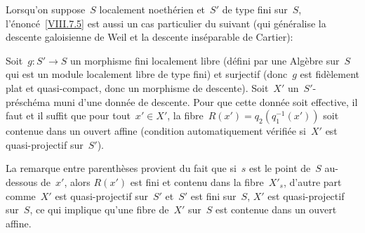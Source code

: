Lorsqu'on suppose~$S$ localement noeth\'erien et~$S'$ de type fini
sur~$S$, l'\'enonc\'e~\ref{VIII.7.5} est aussi un cas particulier
du suivant (qui g\'en\'eralise la descente galoisienne de Weil et
la descente ins\'eparable de Cartier):

\begin{corollaire}
\label{VIII.7.6}
Soit~$g\colon S'\to S$ un morphisme fini localement libre
(\ie d\'efini par une Alg\`ebre sur~$S$ qui est un module
localement libre de type fini) et surjectif (donc~$g$ est
fid\`element plat et quasi-compact, donc un morphisme de
descente). Soit~$X'$ un~$S'$-pr\'esch\'ema muni d'une donn\'ee
de descente. Pour que cette donn\'ee soit effective, il faut et il
suffit que pour tout~$x'\in X'$, la
fibre~$R(x')=q_{2}(q_{1}^{-1}(x'))$ soit contenue dans un ouvert
affine (condition automatiquement v\'erifi\'ee si~$X'$ est
quasi-projectif sur~$S'$).
\end{corollaire}

La remarque entre parenth\`eses provient du fait que si~$s$ est le
point de~$S$ au-dessous de~$x'$, alors $R(x')$ est fini et contenu
dans la
fibre~$X'_{s}$,
d'autre part comme~$X'$ est quasi-projectif sur~$S'$ et~$S'$ est fini
sur~$S$, $X'$ est quasi-projectif sur~$S$, ce qui implique qu'une
fibre
de~$X'$ sur~$S$
est contenue dans un ouvert affine.

